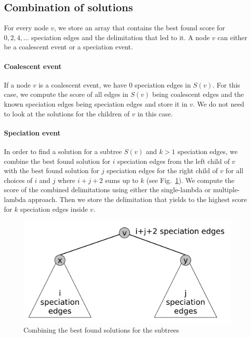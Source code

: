 \documentclass{llncs}
\begin{document}
\subsection{Combination of solutions}

For every node $v$, we store an array that contains the best found score for $0, 2, 4, \ldots$ speciation edges and the delimitation that led to it. A node $v$ can either be a coalescent event or a speciation event.

\paragraph{Coalescent event}
If a node $v$ is a coalescent event, we have $0$ speciation edges in $S(v)$. For this case, we compute the score of all edges in $S(v)$ being coalescent edges and the known speciation edges being speciation edges and store it in $v$. We do not need to look at the solutions for the children of $v$ in this case.

\paragraph{Speciation event}
In order to find a solution for a subtree $S(v)$ and $k>1$ speciation edges, we combine the best found solution for $i$ speciation edges from the left child of $v$ with the best found solution for $j$ speciation edges for the right child of $v$ for all choices of $i$ and $j$ where $i+j+2$ sums up to $k$ (see Fig.~\ref{fig:combining}). We compute the score of the combined delimitations using either the single-lambda or multiple-lambda approach. Then we store the delimitation that yields to the highest score for $k$ speciation edges inside $v$.

\begin{figure}[h!]
\centering
\includegraphics[scale=0.3]{images/speciation_events.pdf}
\caption{Combining the best found solutions for the subtrees}
\label{fig:combining}
\end{figure}
\end{document}
